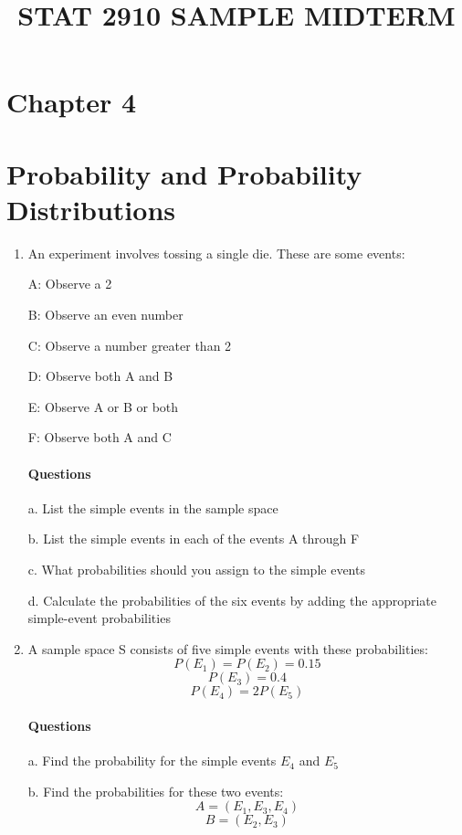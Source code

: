 \documentclass{article}
\title{STAT 2910 SAMPLE MIDTERM}
\begin{document}
\maketitle

\section*{Chapter 4}
\section*{Probability and Probability Distributions}

\begin{enumerate}
    \item An experiment involves tossing a single die. These are some events:
    
    A: Observe a 2

    B: Observe an even number

    C: Observe a number greater than 2

    D: Observe both A and B

    E: Observe A or B or both

    F: Observe both A and C
    
\paragraph*{Questions} 

    
    
    \hfill \break a. List the simple events in the sample space

    b. List the simple events in each of the events A through F

    c. What probabilities should you assign to the simple events

    d. Calculate the probabilities of the six events by adding the appropriate simple-event probabilities
    
    \item A sample space S consists of five simple events with these probabilities:
    $$P(E_1) = P(E_2) = 0.15$$
    $$P(E_3) = 0.4$$
    $$P(E_4) = 2P(E_5)$$
    \paragraph*{Questions}
    
    \hfill \break a. Find the probability for the simple events $E_4$ and $E_5$
    
    b. Find the probabilities for these two events:
        $$A = (E_1, E_3, E_4)$$
        $$B = (E_2, E_3)$$
   

\end{enumerate}
\end{document}
